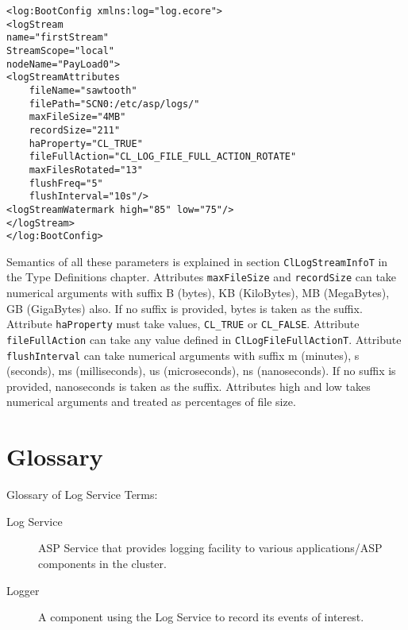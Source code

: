 \begin{flushleft}
\begin{verbatim}
<log:BootConfig xmlns:log="log.ecore">
<logStream
name="firstStream"
StreamScope="local"
nodeName="PayLoad0">
<logStreamAttributes
	fileName="sawtooth"
	filePath="SCN0:/etc/asp/logs/"
	maxFileSize="4MB"
	recordSize="211"
	haProperty="CL_TRUE"
	fileFullAction="CL_LOG_FILE_FULL_ACTION_ROTATE"
	maxFilesRotated="13"
	flushFreq="5"
	flushInterval="10s"/>
<logStreamWatermark high="85" low="75"/>
</logStream>
</log:BootConfig>

\end{verbatim}
\normalsize

Semantics of all these parameters is explained in section {\tt{ClLogStreamInfoT}} in the Type Definitions chapter. Attributes {\tt{maxFileSize}} and 
{\tt{recordSize}} can take numerical arguments with suffix B (bytes), KB (KiloBytes), MB (MegaBytes), GB (GigaBytes) also. If no suffix is provided, 
bytes is taken as the suffix. Attribute {\tt{haProperty}} must take values, {\tt{CL\_\-TRUE}} or {\tt{CL\_\-FALSE}}. Attribute {\tt{fileFullAction}} 
can take any value defined in {\tt{ClLogFileFullActionT}}. Attribute {\tt{flushInterval}} can take numerical arguments with 
suffix m (minutes), s (seconds), ms (milliseconds), us (microseconds), ns (nanoseconds). If no suffix is provided, nanoseconds is taken as the suffix. 
Attributes high and low takes numerical arguments and treated as percentages of file size.








\chapter*{Glossary}
\begin{Desc}
\item[Glossary of Log Service Terms:]
\end{Desc}
\par
\par
\begin{description}

\item[Log Service] ASP Service that provides logging facility to various applications/ASP components in the cluster.
\end{description}

\begin{description}

\item[Logger] A component using the Log Service to record its events of interest.
\end{description}



\end{flushleft}
